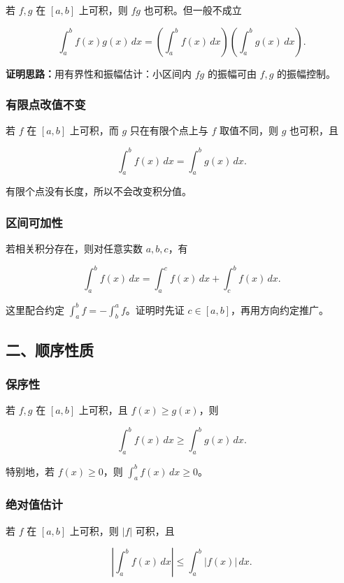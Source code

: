若 \(f,g\) 在 \([a,b]\) 上可积，则 \(fg\) 也可积。但一般不成立

\[
      \int_a^b f(x)g(x)\,dx
      =
      \left(\int_a^b f(x)\,dx\right)
      \left(\int_a^b g(x)\,dx\right).
    \]

\textbf{证明思路：}用有界性和振幅估计：小区间内 \(fg\) 的振幅可由 \(f,g\) 的振幅控制。

\subsubsection*{有限点改值不变}

若 \(f\) 在 \([a,b]\) 上可积，而 \(g\) 只在有限个点上与 \(f\) 取值不同，则 \(g\) 也可积，且

\[
      \int_a^b f(x)\,dx=\int_a^b g(x)\,dx.
    \]

有限个点没有长度，所以不会改变积分值。

\subsubsection*{区间可加性}

若相关积分存在，则对任意实数 \(a,b,c\)，有

\[
      \int_a^b f(x)\,dx=\int_a^c f(x)\,dx+\int_c^b f(x)\,dx.
    \]

这里配合约定 \(\int_a^b f=-\int_b^a f\)。证明时先证 \(c\in[a,b]\)，再用方向约定推广。

\subsection*{二、顺序性质}

\subsubsection*{保序性}

若 \(f,g\) 在 \([a,b]\) 上可积，且 \(f(x)\ge g(x)\)，则

\[
      \int_a^b f(x)\,dx\ge \int_a^b g(x)\,dx.
    \]

特别地，若 \(f(x)\ge0\)，则 \(\int_a^b f(x)\,dx\ge0\)。

\subsubsection*{绝对值估计}

若 \(f\) 在 \([a,b]\) 上可积，则 \(|f|\) 可积，且

\[
      \left|\int_a^b f(x)\,dx\right|
      \le
      \int_a^b |f(x)|\,dx.
    \]

